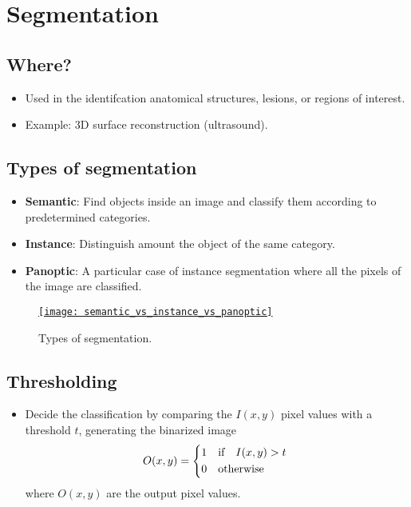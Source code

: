 \chapter{Segmentation}

\section{Where?}
\begin{itemize}
\item Used in the identifcation anatomical structures, lesions, or regions of interest.
\item Example: 3D surface reconstruction (ultrasound).
\end{itemize}
  
\section{Types of segmentation}

\begin{itemize}
\item \textbf{Semantic}: Find objects inside an image and classify them according to predetermined categories.
\item \textbf{Instance}: Distinguish amount the object of the same category.
\item \textbf{Panoptic}: A particular case of instance segmentation where all the pixels of the image are classified.
\end{itemize}

\begin{figure}[H]
  \vspace{-0ex}
  \centering
  \href{https://www.labellerr.com/blog/semantic-vs-instance-vs-panoptic-which-image-segmentation-technique-to-choose/}{\texttt{[image: semantic\_vs\_instance\_vs\_panoptic]}}
  \caption{Types of segmentation.}
  \label{fig:types_segmentation}
\end{figure}

\section{Thresholding \cite{gonzalez2009digital}}
\begin{itemize}
\item Decide the classification by comparing the $I(x,y)$ pixel values with a threshold $t$, generating the binarized image
  \begin{equation}
    O(x,y) = \begin{cases*}
      1 & {\text if}\quad $I(x,y)>t$ \\
      0 & {\text otherwise}
    \end{cases*} 
  \end{equation}
  where $O(x,y)$ are the output pixel values.
\end{itemize}

